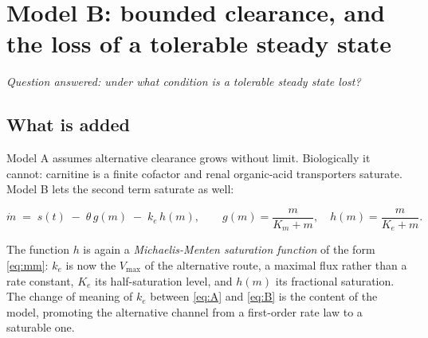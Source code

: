 \section{Model B: bounded clearance, and the loss of a tolerable steady state}

\emph{Question answered: under what condition is a tolerable steady state lost?}

\subsection{What is added}

Model A assumes alternative clearance grows without limit. Biologically it cannot:
carnitine is a finite cofactor and renal organic-acid transporters saturate. Model B lets
the second term saturate as well:

\begin{equation}
\dot m \;=\; s(t) \;-\; \theta\, g(m) \;-\; k_e\, h(m),
\qquad g(m) = \frac{m}{K_m + m}, \quad h(m) = \frac{m}{K_e + m}.
\label{eq:B}
\end{equation}

The function $h$ is again a \emph{Michaelis-Menten saturation function} of the form
\eqref{eq:mm}: $k_e$ is now the $V_{\max}$ of the alternative route, a maximal flux rather
than a rate constant, $K_e$ its half-saturation level, and $h(m)$ its fractional saturation.
The change of meaning of $k_e$ between \eqref{eq:A} and \eqref{eq:B} is the content of the
model, promoting the alternative channel from a first-order rate law to a saturable one.

